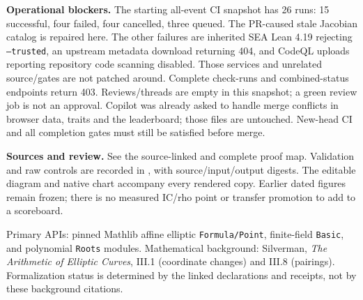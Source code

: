 \documentclass[10pt]{article}
\begin{document}
\textbf{Operational blockers.} The starting all-event CI snapshot has 26 runs:
15 successful, four failed, four cancelled, three queued. The PR-caused stale
Jacobian catalog is repaired here. The other failures are inherited SEA Lean
4.19 rejecting \texttt{--trusted}, an upstream metadata download returning 404,
and CodeQL uploads reporting repository code scanning disabled. Those services
and unrelated source/gates are not patched around. Complete check-runs and
combined-status endpoints return 403. Reviews/threads are empty in this snapshot;
a green review job is not an approval. Copilot was already asked to handle merge
conflicts in browser data, traits and the leaderboard; those files are untouched.
New-head CI and all completion gates must still be satisfied before merge.

\textbf{Sources and review.} See the source-linked  and complete
 proof map. Validation and raw controls are recorded in
, with source/input/output digests.
The editable diagram and native
chart accompany every rendered copy. Earlier dated figures remain frozen;
there is no measured IC/rho point or transfer promotion to add to a scoreboard.

Primary APIs: pinned Mathlib affine elliptic \texttt{Formula/Point},
finite-field \texttt{Basic}, and polynomial \texttt{Roots} modules. Mathematical
background: Silverman, \emph{The Arithmetic of Elliptic Curves}, III.1
(coordinate changes) and III.8 (pairings). Formalization status is determined
by the linked declarations and receipts, not by these background citations.
\end{document}
